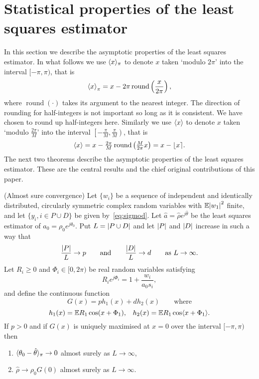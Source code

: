 \documentclass[journal]{IEEEtran}
\begin{document}
\section{Statistical properties of the least squares estimator}\label{sec:stat-prop-least}

In this section we describe the asymptotic properties of the least squares estimator.  In what follows we use $\langle x \rangle_\pi$ to denote $x$ taken `modulo $2\pi$' into the interval $[-\pi, \pi)$, that is
\[
\left\langle x \right\rangle_\pi = x - 2\pi\operatorname{round}\left(\frac{x}{2\pi}\right),
\]
where $\operatorname{round}(\cdot)$ takes its argument to the nearest integer.  The direction of rounding for half-integers is not important so long as it is consistent.  We have chosen to round up half-integers here.  Similarly we use $\langle x \rangle$ to denote $x$ taken `modulo $\tfrac{2\pi}{M}$' into the interval $\left[-\tfrac{\pi}{M}, \tfrac{\pi}{M}\right)$, that is
\[
\left\langle x \right\rangle = x - \tfrac{2\pi}{M}\operatorname{round}\left(\tfrac{M}{2\pi}x\right) = x - {\left\lfloor x \right\rceil}.
\]
The next two theorems describe the asymptotic properties of the least squares estimator.  These are the central results and the chief original contributions of this paper.

\begin{theorem}\label{thm:consistency} (Almost sure convergence)
Let $\{w_i\}$ be a sequence of independent and identically distributed, circularly symmetric complex random variables with ${\mathbb E} {\left\vert w_1 \right\vert}^2$ finite, and let $\{y_i, i \in P \cup D\}$ be given by~\eqref{eq:sigmod}.   Let $\hat{a} = \hat{\rho}e^{j\hat{\theta}}$ be the least squares estimator of $a_0 = \rho_0e^{j\theta_0}$. %
Put $L = {\left\vert P \cup D \right\vert}$ and let ${\left\vert P \right\vert}$ and ${\left\vert D \right\vert}$ increase in such a way that
\[
\frac{{\left\vert P \right\vert}}{L} \rightarrow p \qquad \text{and} \qquad \frac{{\left\vert D \right\vert}}{L} \rightarrow d \qquad \text{as $L \rightarrow \infty$.}
\] 
Let $R_i \geq 0$ and $\Phi_i \in [0,2\pi)$ be real random variables satisfying
\begin{equation}\label{eq:RiandPhii}
R_ie^{j\Phi_i} = 1 + \frac{w_i}{a_0 s_i} ,
\end{equation}
and define the continuous function
\[
G(x) = p h_1(x) + d h_2(x) \qquad \text{where}
\]
\[
h_1(x) = {\mathbb E} R_1 \cos(x + \Phi_1), \;\;\; h_2(x) =  {\mathbb E} R_1 \cos\langle  x + \Phi_1 \rangle.
\]
If $p > 0$ and if $G(x)$ is uniquely maximised at $x = 0$ over the interval $[-\pi,\pi)$ then
\begin{enumerate}
\item $\langle \theta_0 - \hat{\theta} \rangle_\pi \rightarrow 0$ almost surely as $L \rightarrow \infty$, \label{thm:consistency:part1}
\item $\hat{\rho} \rightarrow \rho_0 G(0)$ almost surely as $L \rightarrow \infty$. \label{thm:consistency:part2}
\end{enumerate}
\end{theorem}
\end{document}
